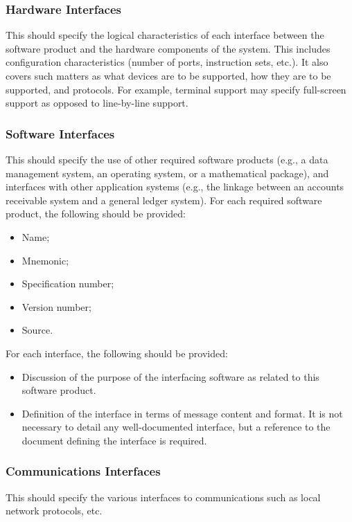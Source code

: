 \documentclass[draftclsnofoot,onecolumn,10pt]{IEEEtran}
\begin{document}
\begin{enumerate}
\subsubsection{Hardware Interfaces} %

This should specify the logical characteristics of each interface between the
software product and the hardware components of the system. This includes
configuration characteristics (number of ports, instruction sets, etc.). It also
covers such matters as what devices are to be supported, how they are to be
supported, and protocols. For example, terminal support may specify full-screen
support as opposed to line-by-line support.


\subsubsection{Software Interfaces} %
This should specify the use of other required software products (e.g., a data
management system, an operating system, or a mathematical package), and
interfaces with other application systems (e.g., the linkage between an accounts
receivable system and a general ledger system). For each required software
product, the following should be provided:
\begin{itemize}
	\item Name;
	\item Mnemonic;
	\item Specification number;
	\item Version number;
	\item Source.
\end{itemize}


For each interface, the following should be provided:

\begin{itemize}
	\item Discussion of the purpose of the interfacing software as related to
		this software product.
	\item Definition of the interface in terms of message content and format. It
		is not necessary to detail any well-documented interface, but a
		reference to the document defining the interface is required.
\end{itemize}

\subsubsection{Communications Interfaces} %
This should specify the various interfaces to communications such as local
network protocols, etc.


\end{enumerate}
\end{document}
